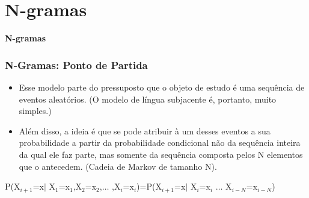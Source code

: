 \documentclass[xcolor=table]{beamer}
\begin{document}
\section{N-gramas}
	\begin{frame}
		\centering	
		\textbf{N-gramas}
	\end{frame}
\begin{frame}
	\frametitle{N-Gramas: Ponto de Partida}
	\begin{itemize}
		\item Esse modelo parte do pressuposto que o objeto de estudo é uma sequência de eventos aleatórios. (O modelo de língua subjacente é, portanto, muito simples.)\\
		\item Além disso, a ideia é que se pode atribuir à um desses eventos a sua probabilidade a partir da probabilidade condicional não da sequência inteira da qual ele faz parte, mas somente da sequência composta pelos N elementos que o antecedem. (Cadeia de Markov de tamanho N).\\ 
	\end{itemize}
	{\small P(X$_{i+1}$=x$\mid$ X$_{1}$=x$_{1}$,X$_{2}$=x$_{2}$,$\ldots$ ,X$_{i}$=x$_{i}$)=P(X$_{i+1}$=x$\mid$ X$_{i}$=x$_{i}$ $\ldots$ X$_{i-N}$=x$_{i-N}$) }
\end{frame}
\end{document}
